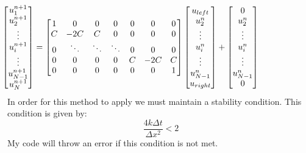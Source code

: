 \documentclass[10pt,letter]{article}
\begin{document}
\begin{equation}
\label{eq:F}
\hspace{-2.5 cm}
\begin{bmatrix}
    u_1^{n+1}\\
    u_2^{n+1}\\
    \vdots \\
    u_i^{n+1} \\
    \vdots \\
    u_{N-1}^{n+1} \\
    u_N^{n+1} \\
\end{bmatrix}
 =
\begin{bmatrix}
    1 & 0 & 0 & 0 & 0 & 0 & 0\\
    C & -2C & C & 0 & 0 & 0 & 0\\
    0 & \ddots & \ddots & \ddots & 0 & 0 & 0\\
    0 & 0 & 0 & 0 & C & -2C & C\\
    0 & 0 & 0 & 0 & 0 & 0 & 1\\
\end{bmatrix}
\begin{bmatrix}
    u_{left} \\
    u_2^n \\
    \vdots \\
    u_i^n \\
    \vdots \\
    u_{N-1}^n \\
    u_{right} \\
\end{bmatrix}
+
\begin{bmatrix}
    0 \\
    u_2^n \\
    \vdots \\
    u_i^n \\
    \vdots \\
    u_{N-1}^n \\
    0 \\
\end{bmatrix}
\end{equation}
In order for this method to apply we must maintain a stability condition. This condition is given by:
\[ \frac{4k\Delta t}{\Delta x^2} < 2\]
My code will throw an error if this condition is not met. 






\end{document}
